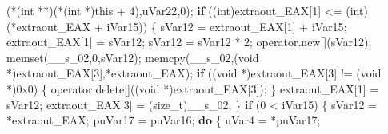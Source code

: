 \documentclass[
]{article}
\newenvironment{Shaded}{}{}
\newcommand{\BaseNTok}[1]{\textcolor[rgb]{0.25,0.63,0.44}{#1}}
\newcommand{\ControlFlowTok}[1]{\textcolor[rgb]{0.00,0.44,0.13}{\textbf{#1}}}
\newcommand{\DataTypeTok}[1]{\textcolor[rgb]{0.56,0.13,0.00}{#1}}
\newcommand{\DecValTok}[1]{\textcolor[rgb]{0.25,0.63,0.44}{#1}}
\newcommand{\NormalTok}[1]{#1}
\newcommand{\OperatorTok}[1]{\textcolor[rgb]{0.40,0.40,0.40}{#1}}
\begin{document}
\begin{Shaded}
\begin{Highlighting}[]
                          \OperatorTok{(*(}\DataTypeTok{int} \OperatorTok{**)(*(}\DataTypeTok{int} \OperatorTok{*)}\NormalTok{this }\OperatorTok{+} \DecValTok{4}\OperatorTok{),}\NormalTok{uVar22}\OperatorTok{,}\DecValTok{0}\OperatorTok{);}
      \ControlFlowTok{if} \OperatorTok{((}\DataTypeTok{int}\OperatorTok{)}\NormalTok{extraout\_EAX}\OperatorTok{[}\DecValTok{1}\OperatorTok{]} \OperatorTok{\textless{}=} \OperatorTok{(}\DataTypeTok{int}\OperatorTok{)(*}\NormalTok{extraout\_EAX }\OperatorTok{+}\NormalTok{ iVar15}\OperatorTok{))} \OperatorTok{\{}
\NormalTok{        sVar12 }\OperatorTok{=}\NormalTok{ extraout\_EAX}\OperatorTok{[}\DecValTok{1}\OperatorTok{]} \OperatorTok{+}\NormalTok{ iVar15}\OperatorTok{;}
\NormalTok{        extraout\_EAX}\OperatorTok{[}\DecValTok{1}\OperatorTok{]} \OperatorTok{=}\NormalTok{ sVar12}\OperatorTok{;}
\NormalTok{        sVar12 }\OperatorTok{=}\NormalTok{ sVar12 }\OperatorTok{*} \DecValTok{2}\OperatorTok{;}
\NormalTok{        operator}\OperatorTok{.}\NormalTok{new}\OperatorTok{[](}\NormalTok{sVar12}\OperatorTok{);}
\NormalTok{        memset}\OperatorTok{(}\NormalTok{\_\_s\_02}\OperatorTok{,}\DecValTok{0}\OperatorTok{,}\NormalTok{sVar12}\OperatorTok{);}
\NormalTok{        memcpy}\OperatorTok{(}\NormalTok{\_\_s\_02}\OperatorTok{,(}\DataTypeTok{void} \OperatorTok{*)}\NormalTok{extraout\_EAX}\OperatorTok{[}\DecValTok{3}\OperatorTok{],*}\NormalTok{extraout\_EAX}\OperatorTok{);}
        \ControlFlowTok{if} \OperatorTok{((}\DataTypeTok{void} \OperatorTok{*)}\NormalTok{extraout\_EAX}\OperatorTok{[}\DecValTok{3}\OperatorTok{]} \OperatorTok{!=} \OperatorTok{(}\DataTypeTok{void} \OperatorTok{*)}\BaseNTok{0x0}\OperatorTok{)} \OperatorTok{\{}
\NormalTok{          operator}\OperatorTok{.}\NormalTok{delete}\OperatorTok{[]((}\DataTypeTok{void} \OperatorTok{*)}\NormalTok{extraout\_EAX}\OperatorTok{[}\DecValTok{3}\OperatorTok{]);}
        \OperatorTok{\}}
\NormalTok{        extraout\_EAX}\OperatorTok{[}\DecValTok{1}\OperatorTok{]} \OperatorTok{=}\NormalTok{ sVar12}\OperatorTok{;}
\NormalTok{        extraout\_EAX}\OperatorTok{[}\DecValTok{3}\OperatorTok{]} \OperatorTok{=} \OperatorTok{(}\DataTypeTok{size\_t}\OperatorTok{)}\NormalTok{\_\_s\_02}\OperatorTok{;}
      \OperatorTok{\}}
      \ControlFlowTok{if} \OperatorTok{(}\DecValTok{0} \OperatorTok{\textless{}}\NormalTok{ iVar15}\OperatorTok{)} \OperatorTok{\{}
\NormalTok{        sVar12 }\OperatorTok{=} \OperatorTok{*}\NormalTok{extraout\_EAX}\OperatorTok{;}
\NormalTok{        puVar17 }\OperatorTok{=}\NormalTok{ puVar16}\OperatorTok{;}
        \ControlFlowTok{do} \OperatorTok{\{}
\NormalTok{          uVar4 }\OperatorTok{=} \OperatorTok{*}\NormalTok{puVar17}\OperatorTok{;}

\end{Highlighting}
\end{Shaded}
\end{document}
